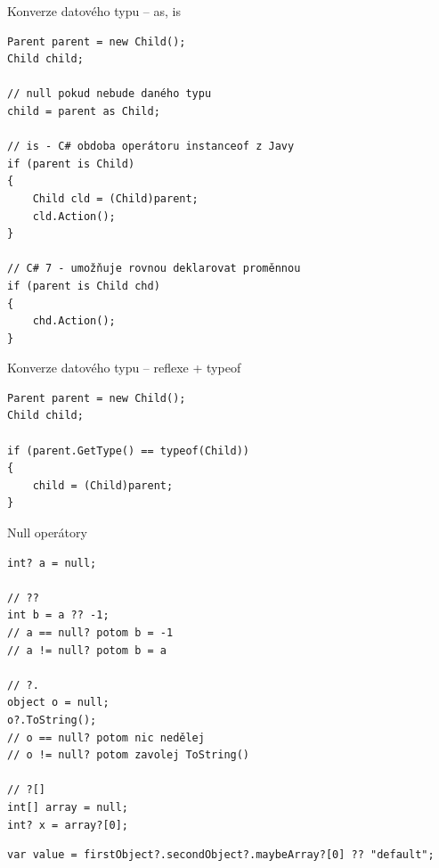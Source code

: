 \begin{frame}[fragile]
\begin{exampleblock}{Konverze datového typu -- as, is}
\begin{lstlisting}[basicstyle=\small]
Parent parent = new Child();
Child child;

// null pokud nebude daného typu
child = parent as Child; 

// is - C# obdoba operátoru instanceof z Javy
if (parent is Child)
{
    Child cld = (Child)parent;
    cld.Action();
}

// C# 7 - umožňuje rovnou deklarovat proměnnou
if (parent is Child chd)
{
    chd.Action();
}
\end{lstlisting}
\end{exampleblock}
\end{frame}




\begin{frame}[fragile]
\begin{bonusblock}{Konverze datového typu -- reflexe + typeof}
\begin{lstlisting}[basicstyle=\small]
Parent parent = new Child();
Child child;

if (parent.GetType() == typeof(Child)) 
{
    child = (Child)parent;
}
\end{lstlisting}
\end{bonusblock}
\end{frame}



\begin{frame}[fragile]
\begin{exampleblock}{Null operátory}
\begin{lstlisting}
int? a = null;

// ??
int b = a ?? -1;
// a == null? potom b = -1
// a != null? potom b = a

// ?.
object o = null;
o?.ToString();
// o == null? potom nic nedělej
// o != null? potom zavolej ToString()

// ?[]
int[] array = null;
int? x = array?[0];
\end{lstlisting}
\end{exampleblock}
\vfill
\begin{yesblock}
\begin{lstlisting}
var value = firstObject?.secondObject?.maybeArray?[0] ?? "default";
\end{lstlisting}
\end{yesblock}
\end{frame}



